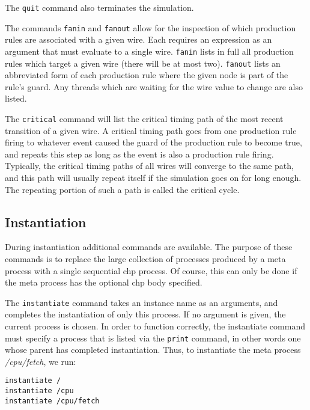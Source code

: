 The \verb|quit| command also terminates the simulation.

The commands \verb|fanin| and \verb|fanout| allow for the inspection of
which production rules are associated with a given wire.
Each requires an expression as an argument that must evaluate to a single wire.
\verb|fanin| lists in full all production rules which target a given wire
(there will be at most two).  \verb|fanout| lists an abbreviated form of each
production rule where the given node is part of the rule's guard.  Any threads
which are waiting for the wire value to change are also listed.

The \verb|critical| command will list the critical timing path of the most
recent transition of a given wire.  A critical timing path goes from one
production rule firing to whatever event caused the guard of the production
rule to become true, and repeats this step as long as the event is also a
production rule firing.  Typically, the critical timing paths of all wires
will converge to the same path, and this path will usually repeat itself if
the simulation goes on for long enough.  The repeating portion of such a
path is called the critical cycle.

\subsection{Instantiation}\label{sec:instantiation}


During instantiation additional commands are available.  The purpose of these
commands is to replace the large collection of processes produced by a meta
process with a single sequential chp process.  Of course, this can only be done
if the meta process has the optional chp body specified.

The \verb|instantiate| command
takes an instance name as an arguments, and completes the instantiation of only
this process.  If no argument is given, the current process is chosen.  In order to
function correctly, the instantiate command must specify a process that is listed
via the \verb|print| command, in other words one whose parent has completed
instantiation.  Thus, to instantiate the meta process {\it{}/cpu/fetch}, we run:
\begin{verbatim}
instantiate /
instantiate /cpu
instantiate /cpu/fetch
\end{verbatim}

